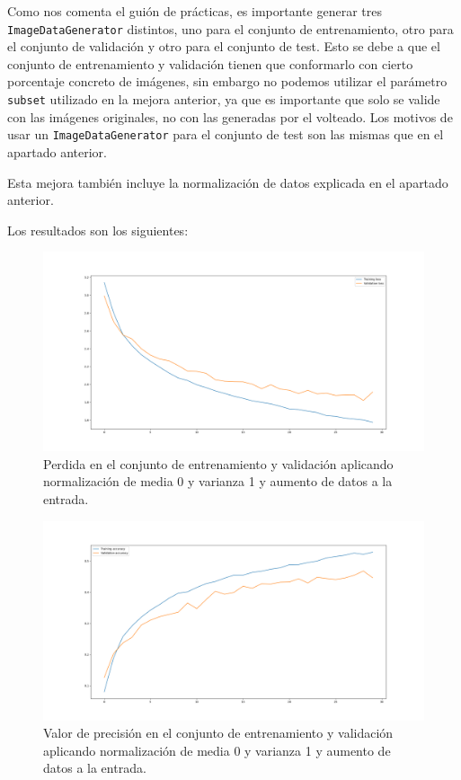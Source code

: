\documentclass[12pt, spanish]{article}
\begin{document}
Como nos comenta el guión de prácticas, es importante generar tres \texttt{ImageDataGenerator} distintos, uno para el conjunto de entrenamiento, otro para el conjunto de validación y otro para el conjunto de test. Esto se debe a que el conjunto de entrenamiento y validación tienen que conformarlo con cierto porcentaje concreto de imágenes, sin embargo no podemos utilizar el parámetro \texttt{subset} utilizado en la mejora anterior, ya que es importante que solo se valide con las imágenes originales, no con las generadas por el volteado. Los motivos de usar un \texttt{ImageDataGenerator} para el conjunto de test son las mismas que en el apartado anterior.

Esta mejora también incluye la normalización de datos explicada en el apartado anterior.

Los resultados son los siguientes:

\begin{figure}[H]
  \centering
      \includegraphics[width=\textwidth]{1-2-aumento.png}
 		\caption{Perdida en el conjunto de entrenamiento y validación aplicando normalización de media 0 y varianza 1 y aumento de datos a la entrada.}
\end{figure}

\begin{figure}[H]
  \centering
      \includegraphics[width=\textwidth]{1-2-aumento-2.png}
 		\caption{Valor de precisión en el conjunto de entrenamiento y validación aplicando normalización de media 0 y varianza 1 y aumento de datos a la entrada.}
\end{figure}
\end{document}
